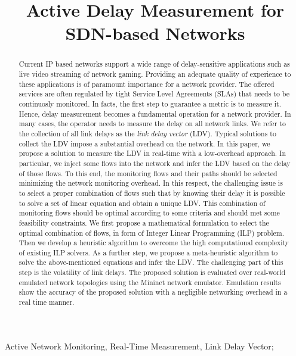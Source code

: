 \documentclass[10pt, journal, letterpaper]{IEEEtran}
\begin{document}
\title{Active Delay Measurement for SDN-based Networks}
\author{}
\maketitle	
\begin{abstract}
Current IP based networks support a wide range of delay-sensitive applications such as live video streaming of network gaming. Providing an adequate quality of experience to these applications is of paramount importance for a network provider. The offered services are often regulated by tight Service Level Agreements (SLAs) that needs to be continuosly monitored.
In facts, the first step to guarantee a metric is to measure it. Hence, delay measurement becomes a fundamental operation for a network provider. In many cases, the operator needs to measure the delay on all network links. We refer to the collection of all link delays as the \textit{link delay vector} (LDV). Typical solutions to collect the LDV impose a substantial overhead on the network. In this paper, we propose a solution to measure the LDV in real-time with a low-overhead approach. In particular, we inject some flows into the network and infer the LDV based on the delay of those flows. To this end, the monitoring flows and their paths should be selected minimizing the network monitoring overhead. In this respect, the challenging issue is to select a proper combination of flows such that by knowing their delay it is possible to solve a set of linear equation and obtain a unique LDV. This combination of monitoring flows should be optimal according to some criteria and should met some feasibility constraints. We first propose a mathematical formulation to select the optimal combination of flows, in form of Integer Linear Programming (ILP) problem. Then we develop a heuristic algorithm to overcome the high computational complexity of existing ILP solvers. As a further step, we propose a meta-heuristic algorithm to solve the above-mentioned equations and infer the LDV. The challenging part of this step is the volatility of link delays. The proposed solution is evaluated over real-world emulated network topologies using the Mininet network emulator. Emulation results show the accuracy of the proposed solution with a negligible networking overhead in a real time manner.
\end{abstract}	
\begin{IEEEkeywords} 
    Active Network Monitoring, Real-Time Measurement, Link Delay Vector;
\end{IEEEkeywords}
\end{document}
